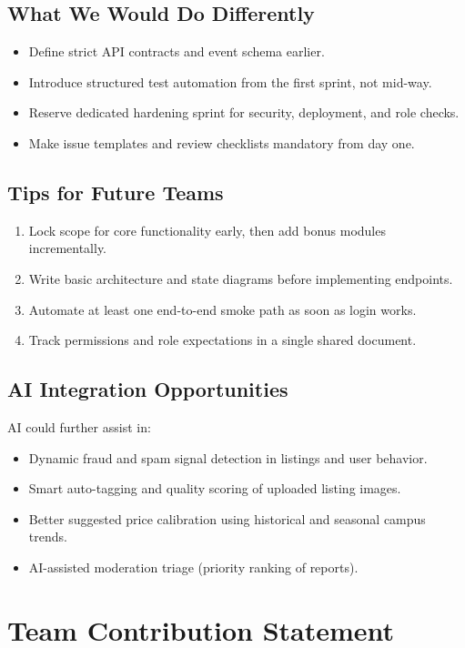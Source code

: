 \documentclass[12pt,a4paper]{article}
\begin{document}
\subsection{What We Would Do Differently}
\begin{itemize}[leftmargin=*]
    \item Define strict API contracts and event schema earlier.
    \item Introduce structured test automation from the first sprint, not mid-way.
    \item Reserve dedicated hardening sprint for security, deployment, and role checks.
    \item Make issue templates and review checklists mandatory from day one.
\end{itemize}

\subsection{Tips for Future Teams}
\begin{enumerate}[leftmargin=*]
    \item Lock scope for core functionality early, then add bonus modules incrementally.
    \item Write basic architecture and state diagrams before implementing endpoints.
    \item Automate at least one end-to-end smoke path as soon as login works.
    \item Track permissions and role expectations in a single shared document.
\end{enumerate}

\subsection{AI Integration Opportunities}
AI could further assist in:
\begin{itemize}[leftmargin=*]
    \item Dynamic fraud and spam signal detection in listings and user behavior.
    \item Smart auto-tagging and quality scoring of uploaded listing images.
    \item Better suggested price calibration using historical and seasonal campus trends.
    \item AI-assisted moderation triage (priority ranking of reports).
\end{itemize}

\newpage
\section{Team Contribution Statement}
\end{document}
